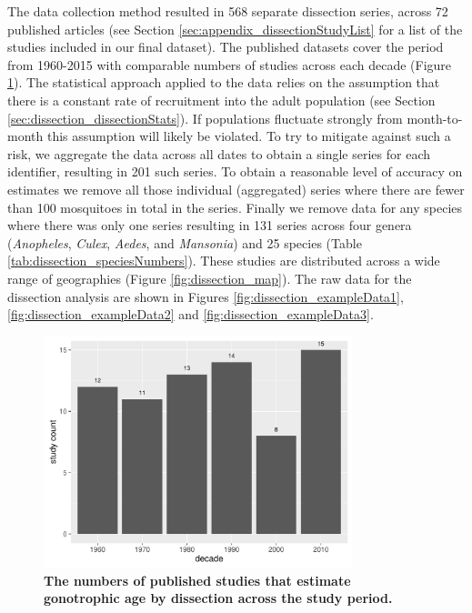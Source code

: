 \documentclass[12pt]{article}
\begin{document}
{The data collection method resulted in 568 separate dissection series, across 72 published articles (see Section \ref{sec:appendix_dissectionStudyList} for a list of the studies included in our final dataset). The published datasets cover the period from 1960-2015 with comparable numbers of studies across each decade (Figure \ref{fig:dissection_timeSeries}). The statistical approach applied to the data relies on the assumption that there is a constant rate of recruitment into the adult population (see Section \ref{sec:dissection_dissectionStats}). If populations fluctuate strongly from month-to-month this assumption will likely be violated. To try to mitigate against such a risk, we aggregate the data across all dates to obtain a single series for each identifier, resulting in 201 such series. To obtain a reasonable level of accuracy on estimates we remove all those individual (aggregated) series where there are fewer than 100 mosquitoes in total in the series. Finally we remove data for any species where there was only one series resulting in 131 series across four genera (\textit{Anopheles}, \textit{Culex}, \textit{Aedes}, and \textit{Mansonia}) and 25 species (Table \ref{tab:dissection_speciesNumbers}). These studies are distributed across a wide range of geographies (Figure \ref{fig:dissection_map}). The raw data for the dissection analysis are shown in Figures \ref{fig:dissection_exampleData1}, \ref{fig:dissection_exampleData2} and \ref{fig:dissection_exampleData3}.


\begin{figure}[ht]
	\centerline{\includegraphics[width=0.8\textwidth]{./Figure_files/dissection_timeSeries.pdf}}
	\caption{\textbf{The numbers of published studies that estimate gonotrophic age by dissection across the study period.}}\label{fig:dissection_timeSeries}
\end{figure}


}
\end{document}
